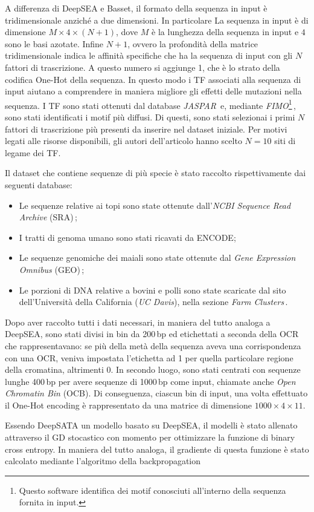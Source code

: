 A differenza di DeepSEA e Basset, il formato della sequenza in input è tridimensionale anziché a due dimensioni. In particolare La sequenza in input è di dimensione $M \times 4 \times (N + 1)$, dove $M$ è la lunghezza della sequenza in input e $4$ sono le basi azotate. Infine $N + 1$, ovvero la profondità della matrice tridimensionale indica le affinità specifiche che ha la sequenza di input con gli $N$ fattori di trascrizione. A questo numero si aggiunge 1, che è lo strato della codifica One-Hot della sequenza. In questo modo i \acs{TF} associati alla sequenza di input aiutano a comprendere in maniera migliore gli effetti delle mutazioni nella sequenza. I \acs{TF} sono stati ottenuti dal database \textsl{JASPAR}\,\cite{jaspar} e, mediante \textsl{FIMO}\footnote{Questo software identifica dei motif conosciuti all'interno della sequenza fornita in input.}\,\cite{grant2011fimo}, sono stati identificati i motif più diffusi. Di questi, sono stati selezionai i primi $N$ fattori di trascrizione più presenti da inserire nel dataset iniziale. Per motivi legati alle risorse disponibili, gli autori dell'articolo hanno scelto $N=10$ siti di legame dei \acs{TF}. 

Il dataset che contiene sequenze di più specie è stato raccolto rispettivamente dai seguenti database:
\begin{itemize}
    \item Le sequenze relative ai topi sono state ottenute dall'\textit{\acs{NCBI} Sequence Read Archive} (\acs{SRA})\,\cite{ncbisra};
    \item I tratti di genoma umano sono stati ricavati da \acs{ENCODE};
    \item Le sequenze genomiche dei maiali sono state ottenute dal \textit{Gene Expression Omnibus} (\acs{GEO})\,\cite{ncbigeo};
    \item Le porzioni di \acs{DNA} relative a bovini e polli sono state scaricate dal sito dell'Università della California (\textsl{UC Davis}), nella sezione \textit{Farm Clusters}\,\cite{ucdavis}.
\end{itemize} 
% 
\noindent Dopo aver raccolto tutti i dati necessari, in maniera del tutto analoga a DeepSEA, sono stati divisi in bin da 200\,bp ed etichettati a seconda della \acs{OCR} che rappresentavano: se più della metà della sequenza aveva una corrispondenza con una \acs{OCR}, veniva impostata l'etichetta ad 1 per quella particolare regione della cromatina, altrimenti 0. In secondo luogo, sono stati centrati con sequenze lunghe 400\,bp per avere sequenze di 1000\,bp come input, chiamate anche \textit{Open Chromatin Bin} (\acs{OCB}). Di conseguenza, ciascun bin di input, una volta effettuato il One-Hot encoding è rappresentato da una matrice di dimensione $1000 \times 4 \times 11$.

Essendo DeepSATA un modello basato su DeepSEA, il modelli è stato allenato attraverso il \acs{GD} stocastico con momento per ottimizzare la funzione di binary cross entropy. In maniera del tutto analoga, il gradiente di questa funzione è stato calcolato mediante l'algoritmo della backpropagation
